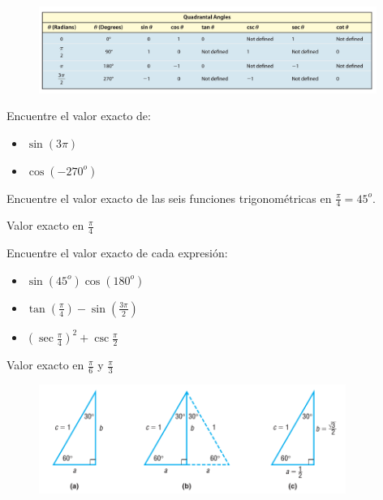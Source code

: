 {}
	\begin{figure}[h]
		\centering
		\includegraphics[width=11cm,keepaspectratio=true]{./trig/sull06t2.png}
		\label{fig:06t2}
	\end{figure}
	

{}
	\begin{problema}
		\label{exmp:sull0603}
		Encuentre el valor exacto de:
		\begin{itemize}
			\item $\sin(3\pi)$ 
			\item $\cos(-270^{o})$
		\end{itemize}
	\end{problema}
	

{}
	\begin{problema}
		\label{exmp:sull0604}
		Encuentre el valor exacto de las seis funciones trigonométricas en $\frac{\pi}{4}=45^{o}$.
	\end{problema}
	

{Valor exacto en $\frac{\pi}{4}$}
	\begin{problema}
		\label{exmp:sull0605}
		Encuentre el valor exacto de cada expresión:
		\begin{itemize}
			\item $\sin(45^{o})\cos(180^{o})$
			\item $\tan\left( \frac{\pi}{4} \right)-\sin\left( \frac{3\pi}{2} \right)$
			\item $\left( \sec\frac{\pi}{4} \right)^{2}+\csc\frac{\pi}{2}$
		\end{itemize}
		
	\end{problema}
	

{Valor exacto en $\frac{\pi}{6}$ y $\frac{\pi}{3}$}
	\begin{figure}[h]
		\centering
		\includegraphics[width=10cm,keepaspectratio=true]{./trig/sull0624.png}
		\label{fig:0624}
	\end{figure}
	

